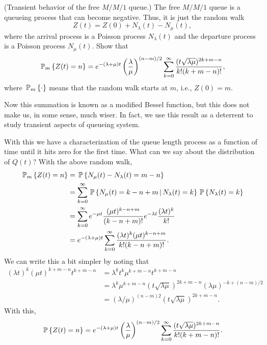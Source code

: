 \begin{question} (Transient behavior of the free $M/M/1$ queue.)  The
  free $M/M/1$ queue is a queueing process that can become
  negative. Thus, it is just the random walk
\begin{equation*}
  Z(t) = Z(0) + N_\lambda(t) - N_\mu(t), 
\end{equation*}
where the arrival process is a Poisson process $N_\lambda(t)$ and the
departure process is a Poisson process $N_\mu(t)$. Show that
\begin{equation*}
    \PP{m}{Z(t)=n} 
= e^{-(\lambda+\mu)t} \left(\frac\lambda\mu\right)^{(n-m)/2} \sum_{k=0}^\infty 
\frac{(t\sqrt{\lambda\mu} )^{2k+m-n}}{k!(k+m-n)!},
\end{equation*}
where $\PP{m}{\cdot}$ means that the random walk starts at $m$, i.e.,
$Z(0)=m$.


Now this summation is known as a modified Bessel function, but this
does not make us, in some sense, much wiser. In fact, we use this
result as a deterrent to study transient aspects of queueing system.



\begin{solution}
With this we have a characterization of the queue length process as a
function of time until it hits zero for the first time. What can we
say about the distribution of $Q(t)$? With the above random walk, 
\begin{equation*}
  \begin{split}
    \PP{m}{Z(t)=n} 
&= \P{N_\mu(t) - N_\lambda(t) = m-n }  \\
&= \sum_{k=0}^\infty \P{N_\mu(t) = k - n + m\given N_\lambda(t) = k } \P{N_\lambda(t)=k}\\
&= \sum_{k=0}^\infty e^{-\mu t} \frac{(\mu t)^{k -n+m}}{(k-n +m)!} e^{-\lambda t} \frac{(\lambda t)^k}{k!} \\
&= e^{-(\lambda+\mu)t} \sum_{k=0}^\infty \frac{(\lambda t)^k(\mu t)^{k  -n + m }}{k!(k-n+m)!}.
  \end{split}
\end{equation*}
We can write this a bit simpler by noting that
\begin{equation*}
  \begin{split}
  (\lambda t)^k (\mu t) ^{k + m - n} t^{k+m-n} 
&=  \lambda^k t^k\mu^{k + m - n} t^{k+m-n} \\
&= \lambda^k \mu^{k + m - n} (t\sqrt{\lambda \mu})^{2k+m-n} (\lambda\mu)^{-k + (n-m)/2} \\
&= (\lambda/\mu)^{(n-m)2} (t\sqrt{\lambda \mu})^{2k+m-n}.
  \end{split}
\end{equation*}
With this,
\begin{equation*}
    \P{Z(t)=n} 
= e^{-(\lambda+\mu)t} \left(\frac\lambda\mu\right)^{(n-m)/2} \sum_{k=0}^\infty 
\frac{(t\sqrt{\lambda\mu} )^{2k+m-n}}{k!(k+m-n)!}.
\end{equation*}
  

\end{solution}
\end{question}
